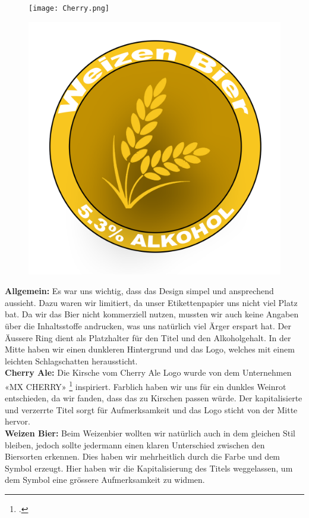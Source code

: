 \begin{figure}[!h]
    \centering
    \begin{minipage}{.5\textwidth}
      \centering
      \texttt{[image: Cherry.png]}
      \label{fig:test1}
    \end{minipage}%
    \begin{minipage}{.5\textwidth}
      \centering
      \includegraphics[width=.7\linewidth]{Figures/Wheat.png}
      \label{fig:test2}
    \end{minipage}
\end{figure}

\textbf{Allgemein:}
Es war uns wichtig, dass das Design simpel und ansprechend aussieht. Dazu waren wir limitiert, da unser Etikettenpapier uns nicht viel Platz bat. Da wir das Bier nicht kommerziell nutzen, mussten wir auch keine Angaben über die Inhaltsstoffe andrucken, was uns natürlich viel Ärger erspart hat. Der Äussere Ring dient als Platzhalter für den Titel und den Alkoholgehalt. In der Mitte haben wir einen dunkleren Hintergrund und das Logo, welches mit einem leichten Schlagschatten heraussticht.
\\
\textbf{Cherry Ale:}
Die Kirsche vom Cherry Ale Logo wurde von dem Unternehmen «MX CHERRY» \footcite[Die besten Schalter für mechanische Tastaturen]{Cherry}  inspiriert. Farblich haben wir uns für ein dunkles Weinrot entschieden, da wir fanden, dass das zu Kirschen passen würde. Der kapitalisierte und verzerrte Titel sorgt für Aufmerksamkeit und das Logo sticht von der Mitte hervor.
\\
\textbf{Weizen Bier:}
Beim Weizenbier wollten wir natürlich auch in dem gleichen Stil bleiben, jedoch sollte jedermann einen klaren Unterschied zwischen den Biersorten erkennen. Dies haben wir mehrheitlich durch die Farbe und dem Symbol erzeugt. Hier haben wir die Kapitalisierung des Titels weggelassen, um dem Symbol eine grössere Aufmerksamkeit zu widmen. 
